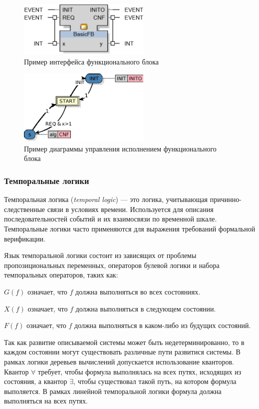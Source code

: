 \documentclass[14pt]{extarticle}
\theoremstyle{plain}
\theoremstyle{definition}
\begin{document}
\begin{figure}[t]
    \centering
    \includegraphics[width=2.5in]{pic/ecc-interface.eps}
    \caption{Пример интерфейса функционального блока}
    \label{fb-interface-example}
\end{figure}

\begin{figure}[t]
    \centering
    \includegraphics[width=2.5in]{pic/ecc-example.eps}
    \caption{Пример диаграммы управления исполнением функционального блока}
    \label{ecc-example}
\end{figure}

\subsubsection{Темпоральные логики}

Темпоральная логика (\emph{temporal logic}) \cite{tl} --- это логика, учитывающая причинно-следственные связи в условиях времени.
Используется для описания последовательностей событий и их взаимосвязи по временной шкале.
Темпоральные логики часто применяются для выражения требований формальной верификации.

Язык темпоральной логики состоит из зависящих от проблемы
пропозициональных переменных, операторов булевой логики и набора темпоральных
операторов, таких как:

$G(f)$ означает, что $f$ должна выполняться во всех состояниях.

$X(f)$ означает, что $f$ должна выполняться в следующем состоянии.

$F(f)$ означает, что $f$ должна выполняться в каком-либо из будущих состояний.

Так как развитие описываемой системы может быть недетерминированно, то в каждом
состоянии могут существовать различные пути развитися системы. В рамках логики
деревьев вычислений допускается использование кванторов. Квантор $\forall$
требует, чтобы формула выполнялась на всех путях, исходящих из состояния, а
квантор $\exists$, чтобы существовал такой путь, на котором формула выполяется.
В рамках линейной темпоральной логики формула должна выполняться на всех путях.
\end{document}
